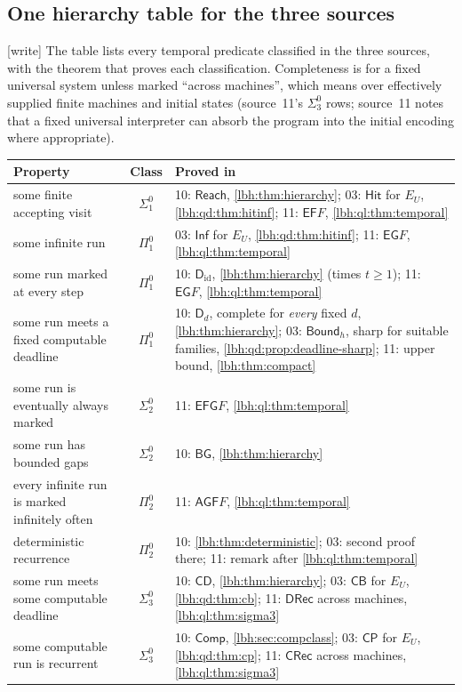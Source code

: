 \documentclass[11pt,letterpaper]{article}
\theoremstyle{definition}
\theoremstyle{remark}
\newcommand{\sig}[1]{\Sigma^{0}_{#1}}
\newcommand{\ppi}[1]{\Pi^{0}_{#1}}
\newcommand{\Clock}{\mathsf{CD}}
\newcommand{\Gap}{\mathsf{BG}}
\newcommand{\Fixed}{\mathsf{D}}
\newcommand{\Reach}{\mathsf{Reach}}
\newcommand{\Comp}{\mathsf{Comp}}
\newcommand{\CP}{\mathsf{CP}}
\newcommand{\CB}{\mathsf{CB}}
\newcommand{\INF}{\mathsf{Inf}}
\newcommand{\HIT}{\mathsf{Hit}}
\newcommand{\BH}{\mathsf{Bound}}
\newcommand{\CRec}{\mathsf{CRec}}
\newcommand{\DRec}{\mathsf{DRec}}
\newcommand{\EF}{\mathsf{EF}}
\newcommand{\EG}{\mathsf{EG}}
\newcommand{\EFG}{\mathsf{EFG}}
\newcommand{\AGF}{\mathsf{AGF}}
\newcommand{\1}{\mathbf 1}
\newcommand{\wtag}{\textup{[write]}}%
\begin{document}
\subsection{One hierarchy table for the three sources}\label{lbh:sec:onetable}
\wtag{} The table lists every temporal predicate classified in the three sources, with the
theorem that proves each classification. Completeness is for a fixed universal system unless
marked ``across machines'', which means over effectively supplied finite machines and initial
states (source~11's $\sig3$ rows; source~11 notes that a fixed universal interpreter can absorb
the program into the initial encoding where appropriate).
\begin{center}
\small
\begin{longtable}{@{}p{}cp{}@{}}
\toprule
Property & Class & Proved in\\
\midrule
\endhead
some finite accepting visit & $\sig1$ & 10: $\Reach$, \cref{lbh:thm:hierarchy}; 03: $\HIT$ for $E_U$, \cref{lbh:qd:thm:hitinf}; 11: $\EF F$, \cref{lbh:ql:thm:temporal}\\
some infinite run & $\ppi1$ & 03: $\INF$ for $E_U$, \cref{lbh:qd:thm:hitinf}; 11: $\EG F$, \cref{lbh:ql:thm:temporal}\\
some run marked at every step & $\ppi1$ & 10: $\Fixed_{\mathrm{id}}$, \cref{lbh:thm:hierarchy} (times $t\ge1$); 11: $\EG F$, \cref{lbh:ql:thm:temporal}\\
some run meets a fixed computable deadline & $\ppi1$ & 10: $\Fixed_d$, complete for \emph{every} fixed $d$, \cref{lbh:thm:hierarchy}; 03: $\BH_h$, sharp for suitable families, \cref{lbh:qd:prop:deadline-sharp}; 11: upper bound, \cref{lbh:thm:compact}\\
some run is eventually always marked & $\sig2$ & 11: $\EFG F$, \cref{lbh:ql:thm:temporal}\\
some run has bounded gaps & $\sig2$ & 10: $\Gap$, \cref{lbh:thm:hierarchy}\\
every infinite run is marked infinitely often & $\ppi2$ & 11: $\AGF F$, \cref{lbh:ql:thm:temporal}\\
deterministic recurrence & $\ppi2$ & 10: \cref{lbh:thm:deterministic}; 03: second proof there; 11: remark after \cref{lbh:ql:thm:temporal}\\
some run meets some computable deadline & $\sig3$ & 10: $\Clock$, \cref{lbh:thm:hierarchy}; 03: $\CB$ for $E_U$, \cref{lbh:qd:thm:cb}; 11: $\DRec$ across machines, \cref{lbh:ql:thm:sigma3}\\
some computable run is recurrent & $\sig3$ & 10: $\Comp$, \cref{lbh:sec:compclass}; 03: $\CP$ for $E_U$, \cref{lbh:qd:thm:cp}; 11: $\CRec$ across machines, \cref{lbh:ql:thm:sigma3}\\

\end{longtable}
\end{center}
\end{document}
